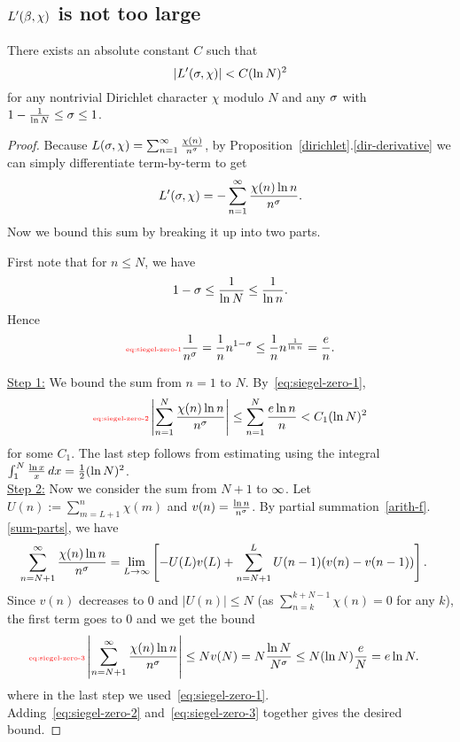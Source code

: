 \subsection{$L'(\beta,\chi)$ is not too large}
\begin{lem}
There exists an absolute constant $C$ such that 
\[
|L'(\sigma,\chi)|<C(\ln N)^2
\]
for any nontrivial Dirichlet character $\chi$ modulo $N$ and any $\sigma$ with $1-\frac{1}{\ln N}\le \sigma\le 1$.
\end{lem}
\begin{proof}
Because $L(\sigma,\chi)=\sum_{n=1}^{\infty} \frac{\chi(n)}{n^{\sigma}}$, by Proposition~\ref{dirichlet}.\ref{dir-derivative} we can simply differentiate term-by-term to get
\[
L'(\sigma,\chi)=-\sum_{n=1}^{\infty} \frac{\chi(n)\ln n}{n^{\sigma}}.
\]
Now we bound this sum by breaking it up into two parts.

First note that for $n\le N$, we have 
\[1-\sigma\le \frac{1}{\ln N}\le \frac{1}{\ln n}.\]
Hence 
\begin{equation}\llabel{eq:siegel-zero-1}
\rc{n^{\si}}=\rc{n}n^{1-\si}\le \rc{n}n^{\rc{\ln n}}=\fc{e}{n}.
\end{equation}

\noindent\underline{Step 1:} We bound the sum from $n=1$ to $N$. 
By~\eqref{eq:siegel-zero-1},
\begin{equation}\llabel{eq:siegel-zero-2}
\ab{\sum_{n=1}^N \fc{\chi(n)\ln n}{n^{\si}}}\le \sum_{n=1}^N \fc{e\ln n}{n}<C_1(\ln N)^2
\end{equation}
for some $C_1$. The last step follows from estimating using the integral $\int_{1}^N \frac{\ln x}{x}\,dx=\frac{1}{2} (\ln N)^2$.\\

\noindent\underline{Step 2:} Now we consider the sum from $N+1$ to $\infty$. 
Let $U(n):=\sum_{m=L+1}^n\chi(m)$ and $v(n)=\frac{\ln n}{n^{\sigma}}$.
By partial summation~\ref{arith-f}.\ref{sum-parts}, we have
\begin{align*}
\sum_{n=N+1}^{\infty} \frac{\chi(n)\ln n}{n^{\sigma}}
&=\lim_{L\to \infty}\left[ {-U(L)v(L) +\sum_{n=N+1}^L U(n-1)(v(n)-v(n-1))} \right].
\end{align*}
Since $v(n)$ decreases to 0 and $|U(n)|\le N$ (as $\sum_{n=k}^{k+N-1}\chi(n)=0$ for any $k$), the first term goes to 0 and we get the bound
\begin{align}
\llabel{eq:siegel-zero-3}
\ab{\sum_{n=N+1}^{\iy} \fc{\chi(n)\ln n}{n^{\si}}}\le Nv(N)&=N\frac{\ln N}{N^{\si}}\le N(\ln N)\frac{e}{N}=e\ln N.
\end{align}
where in the last step we used~\eqref{eq:siegel-zero-1}.\\

Adding~\eqref{eq:siegel-zero-2} and~\eqref{eq:siegel-zero-3} together gives the desired bound.
\end{proof}
